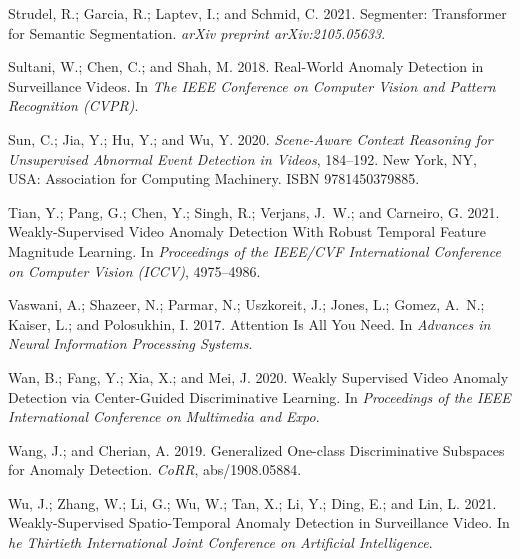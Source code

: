 \documentclass[letterpaper]{article} \usepackage{aaai23}  \usepackage{times}  \usepackage{helvet}  \usepackage{courier}  \usepackage[hyphens]{url}  \usepackage{graphicx} \urlstyle{rm} \def\UrlFont{\rm}  \usepackage{natbib}  \usepackage{caption} \frenchspacing  \setlength{\pdfpagewidth}{8.5in}  \setlength{\pdfpageheight}{11in}  \usepackage{algorithm}
\begin{document}
\begin{thebibliography}{50}
Strudel, R.; Garcia, R.; Laptev, I.; and Schmid, C. 2021.
\newblock Segmenter: Transformer for Semantic Segmentation.
\newblock \emph{arXiv preprint arXiv:2105.05633}.

Sultani, W.; Chen, C.; and Shah, M. 2018.
\newblock Real-World Anomaly Detection in Surveillance Videos.
\newblock In \emph{The IEEE Conference on Computer Vision and Pattern
  Recognition (CVPR)}.

Sun, C.; Jia, Y.; Hu, Y.; and Wu, Y. 2020.
\newblock \emph{Scene-Aware Context Reasoning for Unsupervised Abnormal Event
  Detection in Videos}, 184–192.
\newblock New York, NY, USA: Association for Computing Machinery.
\newblock ISBN 9781450379885.

Tian, Y.; Pang, G.; Chen, Y.; Singh, R.; Verjans, J.~W.; and Carneiro, G. 2021.
\newblock Weakly-Supervised Video Anomaly Detection With Robust Temporal
  Feature Magnitude Learning.
\newblock In \emph{Proceedings of the IEEE/CVF International Conference on
  Computer Vision (ICCV)}, 4975--4986.

Vaswani, A.; Shazeer, N.; Parmar, N.; Uszkoreit, J.; Jones, L.; Gomez, A.~N.;
  Kaiser, L.; and Polosukhin, I. 2017.
\newblock Attention Is All You Need.
\newblock In \emph{Advances in Neural Information Processing Systems}.

Wan, B.; Fang, Y.; Xia, X.; and Mei, J. 2020.
\newblock Weakly Supervised Video Anomaly Detection via Center-Guided
  Discriminative Learning.
\newblock In \emph{Proceedings of the IEEE International Conference on
  Multimedia and Expo}.

Wang, J.; and Cherian, A. 2019.
 Generalized One-class Discriminative Subspaces for Anomaly
  Detection.
\newblock \emph{CoRR}, abs/1908.05884.

Wu, J.; Zhang, W.; Li, G.; Wu, W.; Tan, X.; Li, Y.; Ding, E.; and Lin, L. 2021.
\newblock Weakly-Supervised Spatio-Temporal Anomaly Detection in Surveillance
  Video.
\newblock In \emph{he Thirtieth International Joint Conference on Artificial
  Intelligence}.


\end{thebibliography}
\end{document}
